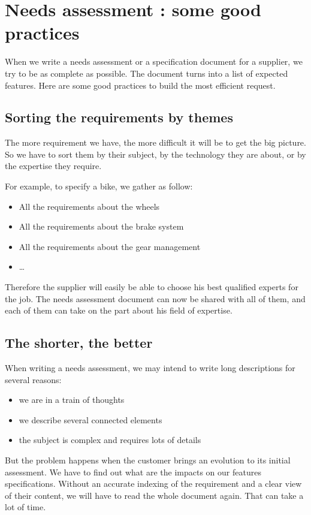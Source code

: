 \setchapterpreamble[u]{\margintoc}
\chapter{Needs assessment : some good practices}
\label{sec:NeedAssessement}
When we write a needs assessment or a specification document for a supplier, we try to be as complete as possible. The document turns into a list of expected features. Here are some good practices to build the most efficient request.

\section{Sorting the requirements by themes}
The more requirement we have, the more difficult it will be to get the big picture. So we have to sort them by their subject, by the technology they are about, or by the expertise they require.

For example, to specify a bike, we gather as follow:
\begin{itemize}
    \item All the requirements about the wheels
    \item All the requirements about the brake system
    \item All the requirements about the gear management
    \item \dots
\end{itemize}

Therefore the supplier will easily be able to choose his best qualified experts for the job. The needs assessment document can now be shared with all of them, and each of them can take on the part about his field of expertise.

\section{The shorter, the better}
When writing a needs assessment, we may intend to write long descriptions for several reasons:

\begin{itemize}
    \item we are in a train of thoughts
    \item we describe several connected elements
    \item the subject is complex and requires lots of details
\end{itemize}

But the problem happens when the customer brings an evolution to its initial assessment. We have to find out what are the impacts on our features specifications. Without an accurate indexing of the requirement and a clear view of their content, we will have to read the whole document again. That can take a lot of time.

